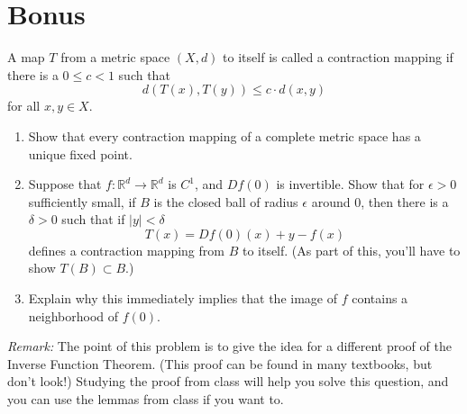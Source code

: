 \documentclass[lang=en,11pt]{template}
\begin{document}
\section*{Bonus}
A map \( T \) from a metric space \( (X, d) \) to itself is called a contraction mapping if there is a \( 0 \leq c < 1 \) such that
\[
d(T(x), T(y)) \leq c \cdot d(x, y)
\]
for all \( x, y \in X \).

\begin{enumerate}
    \item Show that every contraction mapping of a complete metric space has a unique fixed point.
    \item Suppose that \( f : \mathbb{R}^d \to \mathbb{R}^d \) is \( C^1 \), and \( Df(0) \) is invertible. Show that for \( \epsilon > 0 \) sufficiently small, if \( B \) is the closed ball of radius \( \epsilon \) around 0, then there is a \( \delta > 0 \) such that if \( |y| < \delta \)
    \[
    T(x) = Df(0)(x) + y - f(x)
    \]
    defines a contraction mapping from \( B \) to itself. (As part of this, you’ll have to show \( T(B) \subset B \).)
    \item Explain why this immediately implies that the image of \( f \) contains a neighborhood of \( f(0) \).
\end{enumerate}

\textit{Remark:} The point of this problem is to give the idea for a different proof of the Inverse Function Theorem. (This proof can be found in many textbooks, but don’t look!) Studying the proof from class will help you solve this question, and you can use the lemmas from class if you want to.
\end{document}
